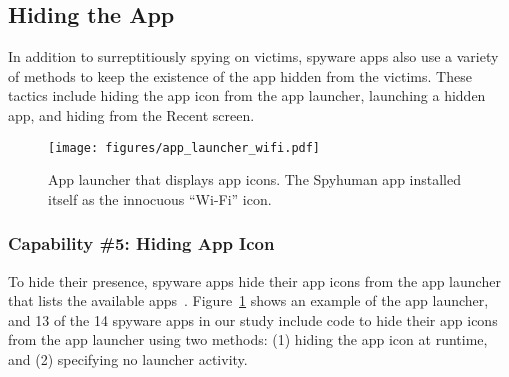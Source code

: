 \documentclass[sigconf,balance=false]{acmart}
\newcommand{\alex}[1]{\textcolor{chicagomaroon}{\noindent[AL: #1]}}
\newcommand{\damon}[1]{\textcolor{blue}{\noindent[DM: #1]}}
\newcommand{\grant}[1]{\textsf{\textcolor{teal}{[GH: #1]}}}
\newcommand{\alex}[1]{}
\newcommand{\grant}[1]{}
\newcommand{\damon}[1]{}
\providecommand{\DIFaddbegin}{} %
\providecommand{\DIFaddend}{} %
\newcommand{\DIFaddincludegraphics}[2][]{{\color{blue}\fbox{\DIFOincludegraphics[#1]{#2}}}} %
\DeclareRobustCommand{\DIFaddbegin}{\DIFOaddbegin \let\includegraphics\DIFaddincludegraphics} %
\DeclareRobustCommand{\DIFaddend}{\DIFOaddend \let\includegraphics\DIFOincludegraphics} %
\begin{document}
\subsection{Hiding the App}
\DIFaddbegin \label{subsec:hiding_the_app}
\DIFaddend %
In addition to surreptitiously spying on victims, spyware apps also use a
variety of methods to keep the existence of the app hidden from the victims.
These tactics include hiding the app icon from the app launcher, launching a
hidden app, and hiding from the Recent screen.

\begin{figure}[t]
\centering
\texttt{[image: figures/app\_launcher\_wifi.pdf]}
\caption{App launcher that displays app icons.
The Spyhuman app installed itself as the innocuous ``Wi-Fi'' icon.}
\label{fig:app_launcher}
\end{figure}

\subsubsection*{Capability \#5: Hiding App Icon}
\label{subsubsec:hide_icon}
To hide their presence,
spyware apps hide their app icons from the app launcher that lists the available
apps~\cite{whataret1:online}. Figure~\ref{fig:app_launcher} shows an example of
the app launcher, and 13 of the 14 spyware apps in our study include code to hide their
app icons from the app launcher using two methods:
(1) hiding the app icon at runtime, and (2) specifying no launcher activity.
\end{document}
